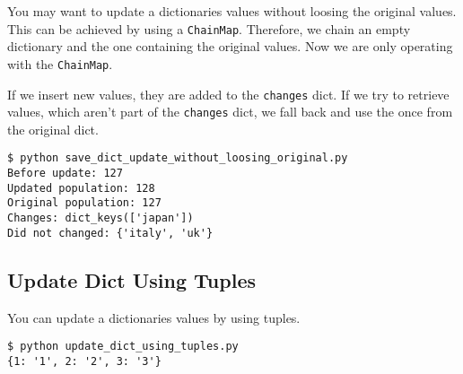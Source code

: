 You may want to update a dictionaries values without loosing the original values.
This can be achieved by using a \lstinline{ChainMap}.
Therefore, we chain an empty dictionary and the one containing the original values.
Now we are only operating with the \lstinline{ChainMap}.



If we insert new values, they are added to the \lstinline{changes} dict.
If we try to retrieve values, which aren't part of the \lstinline{changes} dict, we fall back and use the once from the original dict.

\begin{lstlisting}[caption=Output of save\_dict\_update\_without\_loosing\_original.py]
$ python save_dict_update_without_loosing_original.py
Before update: 127
Updated population: 128
Original population: 127
Changes: dict_keys(['japan'])
Did not changed: {'italy', 'uk'}
\end{lstlisting}


\subsection{Update Dict Using Tuples}

You can update a dictionaries values by using tuples.



\begin{lstlisting}[caption=Output of update\_dict\_using\_tuples.py]
$ python update_dict_using_tuples.py
{1: '1', 2: '2', 3: '3'}
\end{lstlisting}
